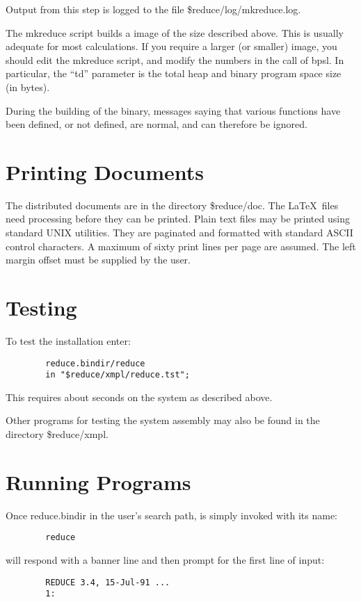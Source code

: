 Output from this step is logged to the file \$reduce/log/mkreduce.log.

The mkreduce script builds a {\REDUCE} image of the size described above.
This is usually adequate for most calculations.  If you require a larger
(or smaller) image, you should edit the mkreduce script, and modify the
numbers in the call of bpsl.  In particular, the ``td'' parameter is the
total heap and binary program space size (in bytes).

During the building of the {\REDUCE} binary, messages saying that various
functions have been defined, or not defined, are normal, and can therefore
be ignored.

\section{Printing Documents}
The distributed documents are in the directory \$reduce/doc.  The
\LaTeX\ files need processing before they can be printed.  Plain text
files may be printed using standard UNIX utilities.  They are paginated
and formatted with standard ASCII control characters.  A maximum of sixty
print lines per page are assumed.  The left margin offset must be supplied
by the user.

\section{Testing {\REDUCE}}
To test the {\REDUCE} installation enter:
\begin{verbatim}
        reduce.bindir/reduce
        in "$reduce/xmpl/reduce.tst";
\end{verbatim}

This requires about {\testtime} seconds on the system as described above.

Other programs for testing the {\REDUCE} system assembly may also be found
in the directory \$reduce/xmpl.

\section{Running {\REDUCE} Programs}
Once reduce.bindir in the user's search path, {\REDUCE} is simply invoked
with its name:
\begin{verbatim}
        reduce
\end{verbatim}
{\REDUCE} will respond with a banner line and then prompt for the first
line of input:
\begin{verbatim}
        REDUCE 3.4, 15-Jul-91 ...
        1:
\end{verbatim}

